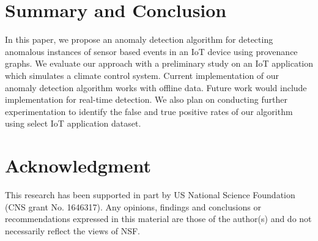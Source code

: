 




\section{Summary and Conclusion}

In this paper, we propose an anomaly detection algorithm for detecting anomalous instances of sensor based events in an IoT device using provenance graphs. We evaluate our approach with a preliminary study on an IoT application which simulates a climate control system. Current implementation of our anomaly detection algorithm works with offline data. Future work would include implementation for real-time detection. We also plan on conducting further experimentation to identify the false and true positive rates of our algorithm using select IoT application dataset. 




\section{Acknowledgment}
This research has been supported in part by US National Science Foundation (CNS grant No. 1646317). Any opinions, findings and conclusions or recommendations expressed in this material are those of the author(s) and do not necessarily reflect the views of NSF.



